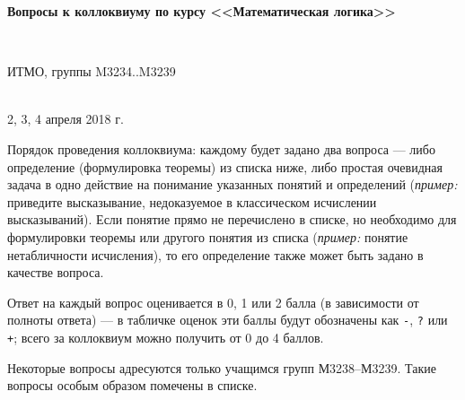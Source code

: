 \documentclass[11pt,a4paper,oneside]{article}
\begin{document}
\begin{center}
\begin{Large}{\bfseries Вопросы к коллоквиуму по курсу <<Математическая логика>>}\end{Large}\\
\vspace{1mm}
\begin{small} ИТМО, группы M3234..M3239\end{small}\\
\small 2, 3, 4 апреля 2018 г.
\end{center}

Порядок проведения коллоквиума: каждому будет задано два вопроса --- либо
определение (формулировка теоремы) из списка ниже, либо простая очевидная
задача в одно действие на понимание указанных понятий и определений
(\emph{пример:} приведите высказывание, недоказуемое в 
классическом исчислении высказываний). Если понятие прямо не перечислено
в списке, но необходимо для формулировки теоремы или другого понятия из 
списка (\emph{пример:} понятие нетабличности исчисления), то его определение 
также может быть задано в качестве вопроса.

Ответ на каждый вопрос оценивается в 0, 1 или 2 балла (в зависимости от полноты
ответа) — в табличке оценок эти баллы будут обозначены как \verb!-!, \verb!?!
или \verb!+!; всего за коллоквиум можно получить от 0 до 4 баллов.

Некоторые вопросы адресуются только учащимся групп М3238--М3239.
Такие вопросы особым образом помечены в списке.
\end{document}
